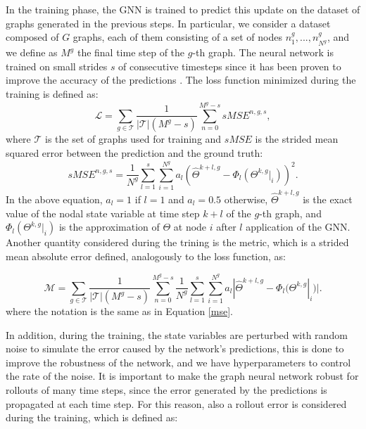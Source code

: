 \documentclass[11pt,a4paper]{article}
\begin{document}
In the training phase, the GNN is trained to predict this update on the dataset of graphs generated in the previous steps. 
In particular, we consider a dataset composed of \(G\) graphs, each of them consisting of a set of nodes \(n_1^g,...,n_{N^g}^g\), and we define as \(M^g\) the final time step of the \(g\)-th graph.
The neural network is trained on small strides \(s\) of consecutive timesteps since it has been proven to improve the accuracy of the predictions \cite{Luca}.
The loss function minimized during the training is defined as:
\begin{equation}
    \mathcal{L} = \sum_{g \in \mathcal{T}} \frac{1}{|\mathcal{T}|(M^g-s)} \sum_{n=0}^{M^g-s} sMSE^{n,g,s},
\end{equation}
where \(\mathcal{T}\) is the set of graphs used for training and \(sMSE\) is the strided mean squared error between the prediction and the ground truth:
\begin{equation}
    sMSE^{n,g,s} = \frac{1}{N^g} \sum_{l=1}^{s} \sum_{i=1}^{N^g} a_l (\hat{\Theta}^{k+l,g} - \Phi_l(\Theta^{k,g}|_i))^2.
    \label{mse}
\end{equation}
In the above equation, \(a_l=1\) if \(l=1\) and \(a_l=0.5\) otherwise, \(\hat{\Theta}^{k+l,g}\) is the exact value of the nodal state variable at time step \(k+l\) of the \(g\)-th graph, and \(\Phi_l(\Theta^{k,g}|_i)\) is the approximation of \(\Theta\) at node \(i\) after \(l\) application of the GNN. 
Another quantity considered during the trining is the metric, which is a strided mean absolute error defined, analogously to the loss function, as:

\begin{equation}
    \mathcal{M} = \sum_{g \in \mathcal{T}} \frac{1}{|\mathcal{T}|(M^g-s)} \sum_{n=0}^{M^g-s} \frac{1}{N^g} \sum_{l=1}^{s} \sum_{i=1}^{N^g} a_l |\hat{\Theta}^{k+l,g} - \Phi_l(\Theta^{k,g}|_i)|.
    \label{metric}
\end{equation}
where the notation is the same as in Equation \eqref{mse}.

In addition, during the training, the state variables are perturbed with random noise to simulate the error caused by the network's predictions, this is done to improve the robustness of the network, and we have hyperparameters to control the rate of the noise. 
It is important to make the graph neural network robust for rollouts of many time steps, since the error generated by the predictions is propagated at each time step. 
For this reason, also a rollout error is considered during the training, which is defined as:
\end{document}
